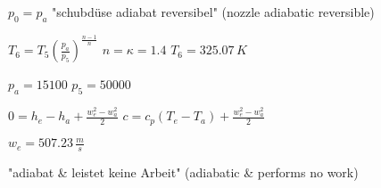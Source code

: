 \( p_0 = p_a \)  
"schubdüse adiabat reversibel" (nozzle adiabatic reversible)  

\( T_6 = T_5 \left( \frac{p_a}{p_5} \right)^{\frac{n-1}{n}} \)  
\( n = \kappa = 1.4 \)  
\( T_6 = 325.07 \, K \)  

\( p_a = 15100 \)  
\( p_5 = 50000 \)  

\( 0 = h_e - h_a + \frac{w_e^2 - w_a^2}{2} \)  
\( c = c_p (T_e - T_a) + \frac{w_e^2 - w_a^2}{2} \)  

\( w_e = 507.23 \, \frac{m}{s} \)  

"adiabat & leistet keine Arbeit" (adiabatic & performs no work)